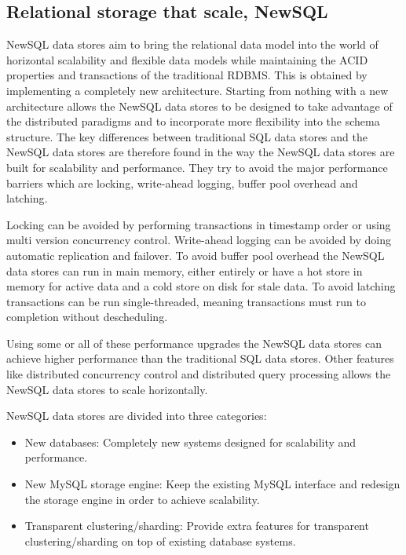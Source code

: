 \subsection{Relational storage that scale, NewSQL}
\label{sec:newsql}
NewSQL data stores aim to bring the relational data model into the world of horizontal scalability and flexible data models while maintaining the ACID properties and transactions of the traditional RDBMS\cite{Cattell:ScalableSQLAndNoSQLDataStores}.
This is obtained by implementing a completely new architecture\cite{CORBETT:SpannerGooglesGloballyDistributedDatabase}.
Starting from nothing with a new architecture allows the NewSQL data stores to be designed to take advantage of the distributed paradigms and to incorporate more flexibility into the schema structure.
The key differences between traditional SQL data stores and the NewSQL data stores are therefore found in the way the NewSQL data stores are built for scalability and performance.
They try to avoid the major performance barriers which are locking, write-ahead logging, buffer pool overhead and latching\cite{Stonebraker:NewSQLvsNoSQLForNewOLTP}.

Locking can be avoided by performing transactions in timestamp order or using multi version concurrency control.
Write-ahead logging can be avoided by doing automatic replication and failover.
To avoid buffer pool overhead the NewSQL data stores can run in main memory, either entirely or have a hot store in memory for active data and a cold store on disk for stale data.
To avoid latching transactions can be run single-threaded, meaning transactions must run to completion without descheduling.

Using some or all of these performance upgrades the NewSQL data stores can achieve higher performance than the traditional SQL data stores.
Other features like distributed concurrency control and distributed query processing allows the NewSQL data stores to scale horizontally.

NewSQL data stores are divided into three categories\cite{Prasanns:NewSQLTheNewWayToHandleBigData}:

\begin{itemize}
\item New databases: Completely new systems designed for scalability and performance.
\item New MySQL storage engine: Keep the existing MySQL interface and redesign the storage engine in order to achieve scalability.
\item Transparent clustering/sharding: Provide extra features for transparent clustering/sharding on top of existing database systems. 
\end{itemize}

